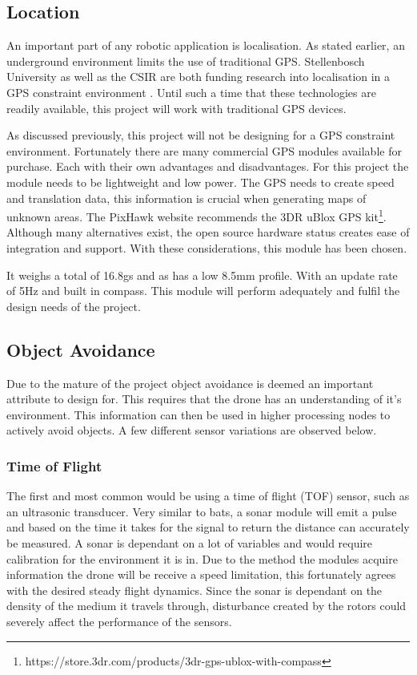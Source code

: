 		
			\subsection{Location}
			An important part of any robotic application is localisation. As stated earlier, an underground environment limits the use of traditional GPS. Stellenbosch University as well as the CSIR are both funding research into localisation in a GPS constraint environment . Until such a time that these technologies are readily available, this project will work with traditional GPS devices.
			
			As discussed previously, this project will not be designing for a GPS constraint environment. Fortunately there are many commercial  GPS modules available for purchase. Each with their own advantages and disadvantages. For this project the module needs to be lightweight and low power. The GPS needs to create speed and translation data, this information is crucial when generating maps of unknown areas. The PixHawk website recommends the 3DR uBlox GPS kit\footnote{https://store.3dr.com/products/3dr-gps-ublox-with-compass}. Although many alternatives exist, the open source hardware status creates ease of integration and support. With these considerations, this module has been chosen.
			
			It weighs a total of 16.8gs and as has a low 8.5mm profile. With an update rate of 5Hz and built in compass. This module will perform adequately and fulfil the design needs of the project.
		
			\subsection{Object Avoidance}\label{SECT_ObjectAvoidance}
			Due to the mature of the project object avoidance is deemed an important attribute to design for. This requires that the drone has an understanding of it's environment. This information can then be used in higher processing nodes to actively avoid objects. A few different sensor variations are observed below. 
		
				\subsubsection{Time of Flight}		
				The first and most common would be using a time of flight (TOF) sensor, such as an ultrasonic transducer. Very similar to bats, a sonar module will emit a pulse and based on the time it takes for the signal to return the distance can accurately be measured. A sonar is dependant on a lot of variables and would require calibration for the environment it is in. Due to the method the modules acquire information the drone will be receive a speed limitation, this fortunately agrees with the desired steady flight dynamics. Since the sonar is dependant on the density of the medium it travels through, disturbance created by the rotors could severely affect the performance of the sensors.
				
